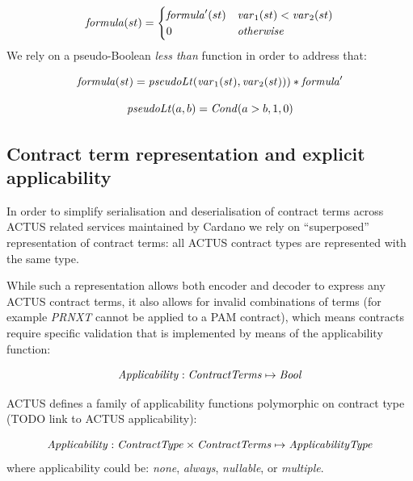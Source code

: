 \documentclass[runningheads]{llncs}
\newcommand{\ident}[1]{\mbox{\emph{#1}}}
\begin{document}
\begin{equation}
\ident{formula}(st)=\begin{cases}
\ident{formula}^\prime(st) & \ident{var}_1(st)<\ident{var}_2(st)\\
0 & \ident{otherwise}
\end{cases}
\end{equation}
We rely on a pseudo-Boolean \emph{less than} function in order to address
that:

\noindent 
\begin{equation}
\ident{formula}(st)=\ident{pseudoLt}(\ident{var}_1(st),\ident{var}_2(st)))*\ident{formula}^\prime
\end{equation}

\noindent 
\begin{equation}
\ident{pseudoLt}(a,b)=\ident{Cond}(a>b,1,0)
\end{equation}


\subsection{Contract term representation and explicit applicability}

In order to simplify serialisation and deserialisation of contract terms
across ACTUS related services maintained by Cardano we rely on ``superposed''
representation of contract terms: all ACTUS contract types are represented
with the same type. 

While such a representation allows both encoder
and decoder to express any ACTUS contract terms, it also allows for
invalid combinations of terms (for example \emph{PRNXT} cannot be applied
to a PAM contract), which means contracts require specific validation
that is implemented by means of the applicability function:

\noindent 
\begin{equation}
\ident{Applicability}:\ident{ContractTerms}\mapsto \ident{Bool}
\end{equation}

ACTUS defines a family of applicability functions polymorphic on contract
type (TODO link to ACTUS applicability):

\smallskip
\noindent 
\begin{equation}
\ident{Applicability} : \ident{ContractType} \times \ident{ContractTerms} \mapsto \ident{ApplicabilityType}
\end{equation}
\noindent
where applicability could be: \emph{none}, \emph{always}, \emph{nullable}, or \emph{multiple}.
\end{document}
